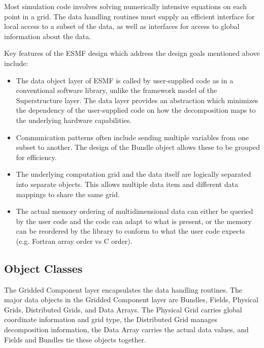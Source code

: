 Most simulation code involves solving numerically intensive
equations on each point in a grid.  The data handling routines
must supply an efficient interface for local access to a
subset of the data, as well as interfaces for access to
global information about the data.

Key features of the ESMF design which address the design goals
mentioned above include:
\begin{itemize}
\item The data object layer of ESMF is called by user-supplied code
as in a conventional software library, unlike the framework model
of the Superstructure layer.
The data layer provides an abstraction which
minimizes the dependency of the user-supplied code on 
how the decomposition maps to the underlying hardware
capabilities.  
\item Communication patterns often include sending multiple
variables from one subset to another.  The design of the Bundle object
allows these to be grouped for efficiency.
\item The underlying computation grid and the data itself are
logically separated into separate objects.  This allows multiple
data item and different data mappings to share the same grid.
\item The actual memory ordering of multidimensional data can either be
queried by the user code and the code can adapt to what is present,
or the memory can be reordered by the library to conform to what
the user code expects (e.g. Fortran array order vs C order).

\end{itemize}

\subsection{Object Classes}

The Gridded Component layer encapsulates the data handling routines.
The major data objects in the Gridded Component layer are Bundles,
Fields, Physical Grids, Distributed Grids, and Data Arrays.
The Physical Grid carries global coordinate information and grid type,
the Distributed Grid manages decomposition information, 
the Data Array carries the actual
data values, and Fields and Bundles tie these objects together.

